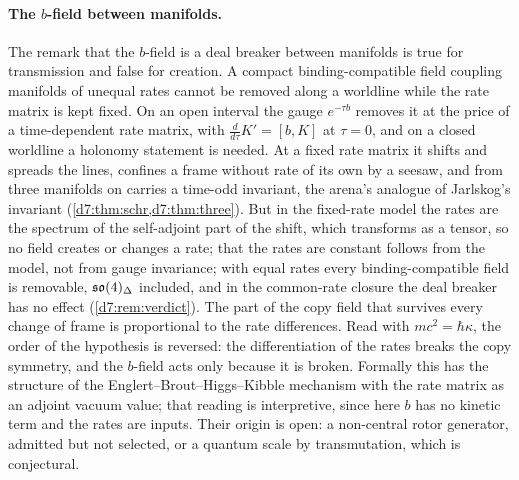 \paragraph{The $b$-field between manifolds.} The remark that the $b$-field is a deal breaker between manifolds is true for transmission and false
for creation. A compact binding-compatible field coupling manifolds of unequal rates cannot be removed along a worldline while the rate matrix is kept fixed. On
an open interval the gauge $e^{-\tau b}$ removes it at the price of a time-dependent rate matrix, with $\tfrac{d}{d\tau}K'=[b,K]$ at $\tau=0$, and on
a closed worldline a holonomy statement is needed. At a fixed rate matrix it shifts and spreads
the lines, confines a frame without rate of its own by a seesaw, and from three manifolds on carries a time-odd invariant, the arena's analogue
of Jarlskog's invariant (\cref{d7:thm:schr,d7:thm:three}). But in the fixed-rate model the rates are the spectrum of the self-adjoint part of the shift, which transforms
as a tensor, so no field creates or changes a rate; that the rates are constant follows from the model, not from gauge invariance; with equal rates every binding-compatible field is removable, $\mathfrak{so}(4)_\Delta$ included, and in the
common-rate closure the deal breaker has no effect (\cref{d7:rem:verdict}). The part of the copy field that survives every change of frame is
proportional to the rate differences. Read with $mc^2=\hbar\kappa$, the order of the hypothesis is reversed: the differentiation of the rates
breaks the copy symmetry, and the $b$-field acts only because it is broken. Formally this has the structure of the Englert--Brout--Higgs--Kibble
mechanism with the rate matrix as an adjoint vacuum value; that reading is interpretive, since here $b$ has no kinetic term and the rates are
inputs. Their origin is open: a non-central rotor generator, admitted but not selected, or a quantum scale by transmutation, which is
conjectural.
